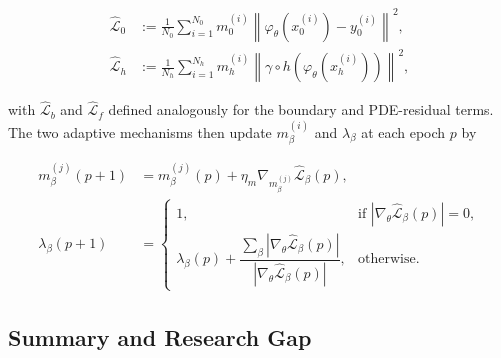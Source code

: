 \documentclass[11pt, a4paper]{article}
\newcommand{\todo}[1]{\textcolor{red}{\textbf{[TODO: #1]}}}
\begin{document}
\begin{align}
    \hat{\mathcal{L}}_0 &:= \frac{1}{N_0} \sum_{i=1}^{N_0} m_0^{(i)} \left\| \varphi_\theta\!\left(x_0^{(i)}\right) - y_0^{(i)} \right\|^2, \label{eq:dcpinn-L0} \\
    \hat{\mathcal{L}}_h &:= \frac{1}{N_h} \sum_{i=1}^{N_h} m_h^{(i)} \left\| \gamma \circ h\!\left(\varphi_\theta\!\left(x_h^{(i)}\right)\right) \right\|^2, \label{eq:dcpinn-Lh}
\end{align}

with $\hat{\mathcal{L}}_b$ and $\hat{\mathcal{L}}_f$ defined analogously for the boundary and PDE-residual terms. The two adaptive mechanisms then update $m_\beta^{(i)}$ and $\lambda_\beta$ at each epoch $p$ by

\begin{align}
    m_\beta^{(j)}(p+1) &= m_\beta^{(j)}(p) + \eta_m \nabla_{m_\beta^{(j)}} \hat{\mathcal{L}}_\beta(p), \label{eq:dcpinn-whack1} \\
    \lambda_\beta(p+1) &=
    \begin{cases}
        1, & \text{if } \left| \nabla_\theta \hat{\mathcal{L}}_\beta(p) \right| = 0, \\[4pt]
        \lambda_\beta(p) + \dfrac{\sum_\beta \left| \nabla_\theta \hat{\mathcal{L}}_\beta(p) \right|}{\left| \nabla_\theta \hat{\mathcal{L}}_\beta(p) \right|}, & \text{otherwise.}
    \end{cases} \label{eq:dcpinn-whack2}
\end{align}

\subsection{Summary and Research Gap}
\label{sec:lit_gap}



\end{document}
